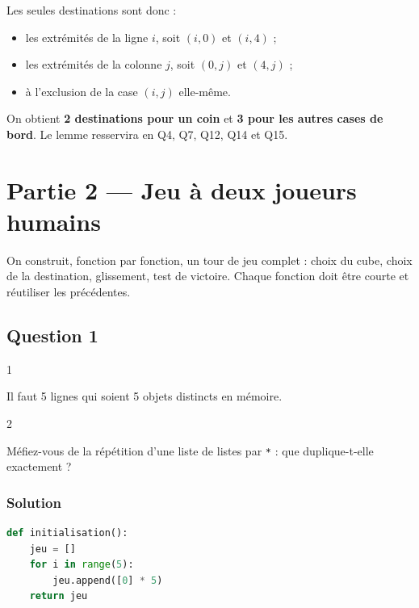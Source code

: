 \documentclass[11pt,a4paper]{article}
\providecommand{\tightlist}{\setlength{\itemsep}{0pt}\setlength{\parskip}{0pt}}
\begin{document}
Les seules destinations sont donc :

\begin{itemize}
\tightlist
\item
  les extrémités de la ligne \(i\), soit \((i,0)\) et \((i,4)\) ;
\item
  les extrémités de la colonne \(j\), soit \((0,j)\) et \((4,j)\) ;
\item
  à l'exclusion de la case \((i,j)\) elle-même.
\end{itemize}

On obtient \textbf{2 destinations pour un coin} et \textbf{3 pour les autres cases de bord}. Le lemme resservira en Q4, Q7, Q12, Q14 et Q15.

\hypertarget{partie-2-jeu-uxe0-deux-joueurs-humains}{%
\section{Partie 2 --- Jeu à deux joueurs humains}\label{partie-2-jeu-uxe0-deux-joueurs-humains}}

On construit, fonction par fonction, un tour de jeu complet : choix du cube, choix de la destination, glissement, test de victoire. Chaque fonction doit être courte et réutiliser les précédentes.

\hypertarget{question-1}{%
\subsection{Question 1}\label{question-1}}

\begin{indication}{1}

Il faut 5 lignes qui soient 5 objets distincts en mémoire.

\end{indication}

\begin{indication}{2}

Méfiez-vous de la répétition d'une liste de listes par \texttt{*} : que duplique-t-elle exactement ?

\end{indication}

\hypertarget{solution}{%
\subsubsection{Solution}\label{solution}}

\begin{lstlisting}[language=Python]
def initialisation():
    jeu = []
    for i in range(5):
        jeu.append([0] * 5)
    return jeu
\end{lstlisting}
\end{document}
